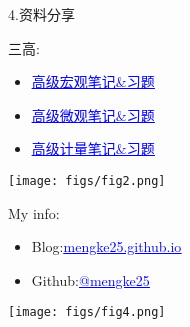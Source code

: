 \documentclass[10pt,aspectratio=43,mathserif,table]{beamer}
\begin{document}
\begin{frame}{\small 4.资料分享}
	
\begin{block}{\footnotesize 三高:}
		\vspace{-0.9em}
	\begin{minipage}[b]{0.4\textwidth} %
		\begin{itemize}
			\item \footnotesize \href{https://pan.quark.cn/s/02f00a7a805a}{\textcolor{blue}{\underline{高级宏观笔记\&习题}}}
		\end{itemize}
		\vspace{0.4em}
		
		\begin{itemize}
			\item \footnotesize \href{https://pan.quark.cn/s/6decfec169e9}{\textcolor{blue}{\underline{高级微观笔记\&习题}}}
		\end{itemize}
		\vspace{0.4em}
		
		\begin{itemize}
			\item \footnotesize \href{https://pan.quark.cn/s/40b4626268ac}{\textcolor{blue}{\underline{高级计量笔记\&习题}}}
		\end{itemize}
		\vspace{0.4em}
	\end{minipage}
	\hfill
	\begin{minipage}[b]{0.55\textwidth} %
		\centering
		\texttt{[image: figs/fig2.png]}
	\end{minipage}
	
	
\end{block}
	
\begin{block}{\footnotesize My info:}
	\vspace{1.5em}
	\begin{minipage}[b]{0.55\textwidth} %
		      
		
		\begin{itemize}
			\item \footnotesize Blog:\quad \quad \href{https://mengke25.github.io}{\textcolor{blue}{\underline{mengke25.github.io}}}
		\end{itemize}
		\vspace{0.4em}    
		
		\begin{itemize}
			\item \footnotesize Github:\quad  \href{https://github.com/mengke25}{\textcolor{blue}{\underline{@mengke25}}}
		\end{itemize}
		\vspace{0.4em}    
	\end{minipage}
	\hfill
	\begin{minipage}[b]{0.2\textwidth} %
		\centering
		\texttt{[image: figs/fig4.png]}
	\end{minipage}
\end{block}

\end{frame}



	
\end{document}
